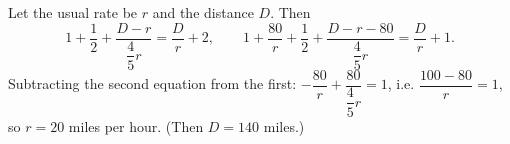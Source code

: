 Let the usual rate be $r$ and the distance $D$. Then
\[1+\dfrac12+\dfrac{D-r}{\dfrac45r}=\dfrac Dr+2,\qquad1+\dfrac{80}{r}+\dfrac12+\dfrac{D-r-80}{\dfrac45r}=\dfrac Dr+1.\]
Subtracting the second equation from the first: $-\dfrac{80}r+\dfrac{80}{\dfrac45r}=1$, i.e. $\dfrac{100-80}{r}=1$, so $r=\boxed{20}$ miles per hour. (Then $D=140$ miles.)
